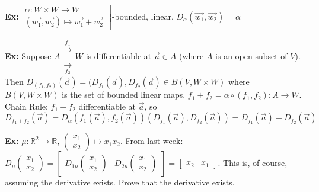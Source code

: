 \documentclass[10pt,letterpaper]{article}
\newcommand{\n}{\hfill\break}
\newcommand{\ex}[1]{\par\noindent\settowidth{\hangindent}{\textbf{Ex: }}\textbf{Ex: }#1\n}
\newcommand{\reals}{\mathbb{R}}
\newcommand{\R}{\reals}
\newcommand{\of}{\circ}
\begin{document}
\ex{$\left.\begin{array}{l}\alpha:W\times{}W\to{}W\\ (\vec{w_{1}},\vec{w_{2}})\mapsto\vec{w_{1}}+\vec{w_{2}}\end{array}\right]$-bounded, linear. $D_{\alpha}(\vec{w_{1}},\vec{w_{2}})=\alpha$}

\ex{Suppose $A\begin{array}{ll}\xrightarrow[]{f_{1}}\\ \xrightarrow[f_{2}]{}\end{array}W$ is differentiable at $\vec{a}\in{}A$ (where $A$ is an open subset of $V$).\n
Then $D_{(f_{1},f_{2})}(\vec{a})=(D_{f_{1}}(\vec{a}),D_{f_{2}}(\vec{a})\in{}B(V,W\times{}W)$ where $B(V,W\times{}W)$ is the set of bounded linear maps.\n
\n
$f_{1}+f_{2}=\alpha\of(f_{1},f_{2}):A\to{}W$.\n
Chain Rule: $f_{1}+f_{2}$ differentiable at $\vec{a}$, so\n
$D_{f_{1}+f_{2}}(\vec{a})=D_{\alpha}(f_{1}(\vec{a}),f_{2}(\vec{a}))(D_{f_{1}}(\vec{a}),D_{f_{2}}(\vec{a}))=D_{f_{1}}(\vec{a})+D_{f_{2}}(\vec{a})$}

\ex{$\mu:\R^{2}\to\R$, $\left(\begin{array}{l}x_{1}\\ x_{2}\end{array}\right)\mapsto{}x_{1}x_{2}$.\n
From last week: $D_{\mu}\left(\begin{array}{l}x_{1}\\ x_{2}\end{array}\right)=\left[\begin{array}{ll}D_{1\mu}\left(\begin{array}{c}x_{1}\\ x_{2}\end{array}\right) & D_{2\mu}\left(\begin{array}{c}x_{1}\\ x_{2}\end{array}\right)\end{array}\right]=\left[\begin{array}{ll}x_{2} & x_{1}\end{array}\right]$.\n
This is, of course, assuming the derivative exists. Prove that the derivative exists.}
\end{document}
